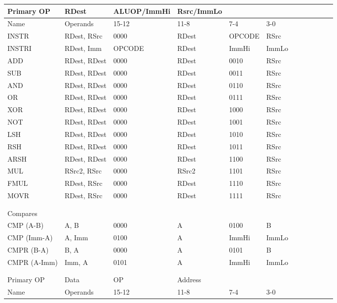 \documentclass[a4paper]{article}
\begin{document}
\def\colorrow{\rowcolor[gray]{0.75}}
\begin{tabular}{|l|l|l|l|l|l|l|l|l|l|l|l|}
\hline
Primary OP&RDest&ALUOP/ImmHi&Rsrc/ImmLo&&&&&&
&&\\
\hline
\colorrow Name&Operands&15-12&11-8&7-4&3-0&&&&
&&\\
\hline
INSTR&RDest, RSrc&0000&RDest&OPCODE&RSrc&&&&
&&\\
\hline
\colorrow INSTRI&RDest, Imm&OPCODE&RDest&ImmHi&ImmLo&&&&
&&\\
\hline
ADD&RDest, RDest&0000&RDest&0010&RSrc&&&&
&&\\
\hline
\colorrow SUB&RDest, RDest&0000&RDest&0011&RSrc&&&&
&&\\
\hline
AND&RDest, RDest&0000&RDest&0110&RSrc&&&&
&&\\
\hline
\colorrow OR&RDest, RDest&0000&RDest&0111&RSrc&&&&
&&\\
\hline
XOR&RDest, RDest&0000&RDest&1000&RSrc&&&&
&&\\
\hline
\colorrow NOT&RDest, RDest&0000&RDest&1001&RSrc&&&&
&&\\
\hline
LSH&RDest, RDest&0000&RDest&1010&RSrc&&&&
&&\\
\hline
\colorrow RSH&RDest, RDest&0000&RDest&1011&RSrc&&&&
&&\\
\hline
ARSH&RDest, RDest&0000&RDest&1100&RSrc&&&&
&&\\
\hline
\colorrow MUL&RSrc2, RSrc&0000&RSrc2&1101&RSrc&&&&
&&\\
\hline
FMUL&RDest, RSrc&0000&RDest&1110&RSrc&&&&
&&\\
\hline
\colorrow MOVR&RDest, RSrc&0000&RDest&1111&RSrc&&&&
&&\\
\hline
&&&&&&&&&
&&\\
\hline
\colorrow &&&&&&&&&
&&\\
\hline
Compares&&&&&&&&&
&&\\
\hline
\colorrow CMP (A-B)&A, B&0000&A&0100&B&&&&
&&\\
\hline
CMP (Imm-A)&A, Imm&0100&A&ImmHi&ImmLo&&&&
&&\\
\hline
\colorrow CMPR (B-A)&B, A&0000&A&0101&B&&&&
&&\\
\hline
CMPR (A-Imm)&Imm, A&0101&A&ImmHi&ImmLo&&&&
&&\\
\hline
\colorrow &&&&&&&&&
&&\\
\hline
&&&&&&&&&
&&\\
\hline
\colorrow Primary OP&Data&OP&Address&&&&&&
&&\\
\hline
Name&Operands&15-12&11-8&7-4&3-0&&&&
&&\\

\end{tabular}
\end{document}
